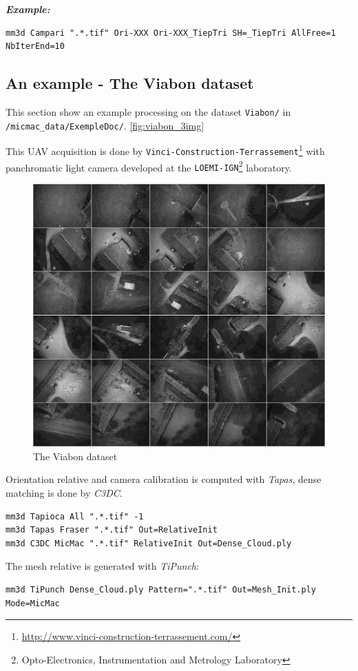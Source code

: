 \textbf{\textit{Example:}}
\begin{verbatim}
mm3d Campari ".*.tif" Ori-XXX Ori-XXX_TiepTri SH=_TiepTri AllFree=1 NbIterEnd=10
\end{verbatim}


\subsection{An example - The Viabon dataset}
This section show an example processing on the dataset {\tt Viabon/} in {\tt /micmac\_data/ExempleDoc/}. \autoref{fig:viabon_3img}

This UAV acquisition is done by {\tt Vinci-Construction-Terrassement}\footnote{\url{http://www.vinci-construction-terrassement.com/}} with  panchromatic light camera developed at the {\tt LOEMI-IGN}\footnote{Opto-Electronics, Instrumentation and Metrology Laboratory} laboratory.\newline


\begin{figure}[H]
    \begin{center}
    \setlength{\unitlength}{0.5cm}
    \includegraphics[width=0.5\linewidth]{FIGS/Viabon/panel.jpg}
    \end{center}
    \caption{The Viabon dataset}
    \label{fig:iris}
\end{figure}

Orientation relative and camera calibration is computed with \textit{Tapas}, dense matching is done by \textit{C3DC}.

\begin{verbatim}
mm3d Tapioca All ".*.tif" -1
mm3d Tapas Fraser ".*.tif" Out=RelativeInit
mm3d C3DC MicMac ".*.tif" RelativeInit Out=Dense_Cloud.ply
\end{verbatim}

The mesh relative is generated with \textit{TiPunch}:

\begin{verbatim}
mm3d TiPunch Dense_Cloud.ply Pattern=".*.tif" Out=Mesh_Init.ply Mode=MicMac
\end{verbatim}

